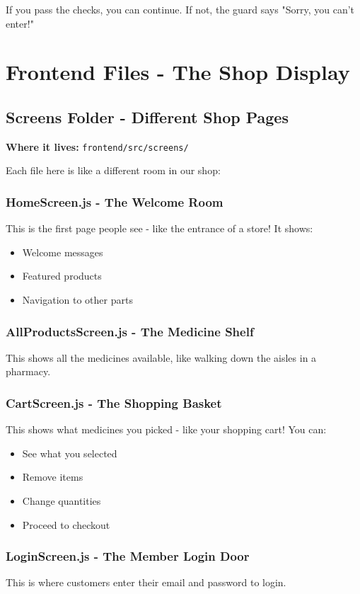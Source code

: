 \documentclass[12pt]{article}
\begin{document}
If you pass the checks, you can continue. If not, the guard says "Sorry, you can't enter!"

\section{Frontend Files - The Shop Display}

\subsection{Screens Folder - Different Shop Pages}

\textbf{Where it lives:} \texttt{frontend/src/screens/}

Each file here is like a different room in our shop:

\subsubsection{HomeScreen.js - The Welcome Room}
This is the first page people see - like the entrance of a store! It shows:
\begin{itemize}
    \item Welcome messages
    \item Featured products
    \item Navigation to other parts
\end{itemize}

\subsubsection{AllProductsScreen.js - The Medicine Shelf}
This shows all the medicines available, like walking down the aisles in a pharmacy.

\subsubsection{CartScreen.js - The Shopping Basket}
This shows what medicines you picked - like your shopping cart! You can:
\begin{itemize}
    \item See what you selected
    \item Remove items
    \item Change quantities
    \item Proceed to checkout
\end{itemize}

\subsubsection{LoginScreen.js - The Member Login Door}
This is where customers enter their email and password to login.
\end{document}
